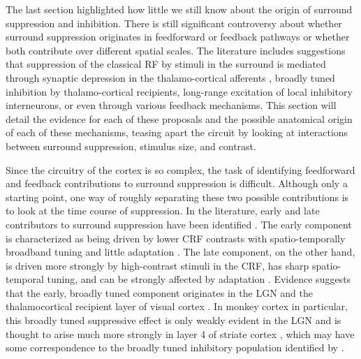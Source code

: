 The last section highlighted how little we still know about the origin
of surround suppression and inhibition. There is still significant
controversy about whether surround suppression originates in feedforward or
feedback pathways or whether both contribute over different spatial
scales. The literature includes suggestions that suppression of the
classical RF by stimuli in the surround is mediated through synaptic depression in the
thalamo-cortical afferents \citep{Carandini2002}, broadly tuned
inhibition by thalamo-cortical recipients, long-range excitation of
local inhibitory interneurons, or even through various feedback
mechanisms. This section will detail the evidence for each of these
proposals and the possible anatomical origin of each of these mechanisms,
teasing apart the circuit by looking at interactions between
surround suppression, stimulus size, and contrast.

Since the circuitry of the cortex is so complex, the task of
identifying feedforward and feedback contributions to surround
suppression is difficult. Although only a starting point, one way of
roughly separating these two possible contributions is to look at
the time course of suppression. In the literature, early and late
contributors to surround suppression have been identified
\citep{Webb2005}. The early component is characterized as being driven
by lower CRF contrasts with spatio-temporally broadband tuning and
little adaptation \citep{Levitt1997,Cavanaugh2002a}. The late
component, on the other hand, is driven more strongly by high-contrast
stimuli in the CRF, has sharp spatio-temporal tuning, and can be
strongly affected by adaptation \citep{Levitt1997}. Evidence suggests
that the early, broadly tuned component originates in the LGN and the
thalamocortical recipient layer of visual cortex
\citep{Blasdel1984a,Hawken1996}. In monkey cortex in particular, this
broadly tuned suppressive effect is only weakly evident in the LGN and
is thought to arise much more strongly in layer 4 of striate cortex
\citep{Webb2005}, which may have some correspondence to the broadly
tuned inhibitory population identified by \cite{Hirsch2003}.

